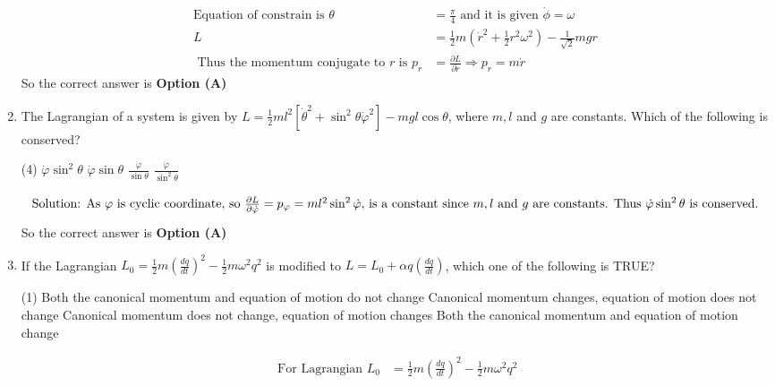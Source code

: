 \begin{enumerate}
\begin{answer}
\begin{align*}
	\text{Equation of constrain is }\theta&=\frac{\pi}{4}\text{ and it is given } \dot{\phi}=\omega\\
	L&=\frac{1}{2} m\left(\dot{r}^{2}+\frac{1}{2} r^{2} \omega^{2}\right)-\frac{1}{\sqrt{2}} m g r\\
	\text{	Thus the momentum conjugate to $r$ is }p_{r}&=\frac{\partial L}{\partial \dot{r}} \Rightarrow p_{r}=m \dot{r}
	\end{align*}
	So the correct answer is \textbf{Option (A)}
\end{answer}
	\item The Lagrangian of a system is given by
	$L=\frac{1}{2} m l^{2}\left[\dot{\theta}^{2}+\sin ^{2} \theta \dot{\varphi}^{2}\right]-m g l \cos \theta$, where $m, l$ and $g$ are constants.
	Which of the following is conserved?
	{}
	\begin{tasks}(4)
		\task[\textbf{A.}] $\dot{\varphi} \sin ^{2} \theta$
		\task[\textbf{B.}] $\dot{\varphi} \sin \theta$
		\task[\textbf{C.}] $\frac{\dot{\varphi}}{\sin \theta}$
		\task[\textbf{D.}] $\frac{\dot{\varphi}}{\sin ^{2} \theta}$
	\end{tasks}
\begin{answer}
	\begin{align*}
	\intertext{Solution: As $\varphi$ is cyclic coordinate, so $\frac{\partial L}{\partial \dot{\varphi}}=p_{\varphi}=m l^{2} \sin ^{2} \dot{\varphi}$, is a constant since $m, l$ and $g$ are constants. Thus $\dot{\varphi} \sin ^{2} \theta$ is conserved.}
	\end{align*}
	So the correct answer is \textbf{Option (A)}
\end{answer}
	\item If the Lagrangian $L_{0}=\frac{1}{2} m\left(\frac{d q}{d t}\right)^{2}-\frac{1}{2} m \omega^{2} q^{2}$ is modified to $L=L_{0}+\alpha q\left(\frac{d q}{d t}\right)$, which one of the following is TRUE?
	{}
	\begin{tasks}(1)
		\task[\textbf{A.}] Both the canonical momentum and equation of motion do not change
		\task[\textbf{B.}] Canonical momentum changes, equation of motion does not change
		\task[\textbf{C.}] Canonical momentum does not change, equation of motion changes
		\task[\textbf{D.}] Both the canonical momentum and equation of motion change
	\end{tasks}
\begin{answer}
	\begin{align*}
	\text{	For Lagrangian }L_{0}&=\frac{1}{2} m\left(\frac{d q}{d t}\right)^{2}-\frac{1}{2} m \omega^{2} q^{2}\\

\end{align*}
\end{answer}
\end{enumerate}
